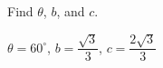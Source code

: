 {Find $\theta$, $b$, and $c$.

\begin{center}
\end{center}}
{$\theta = 60^{\circ}$, $b = \dfrac{ \sqrt{3}}{3}$, $c=\dfrac{2 \sqrt{3}}{3}$}